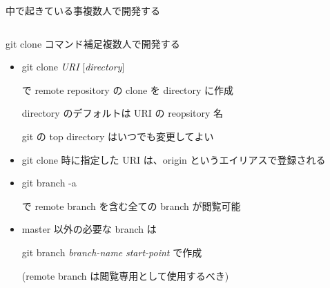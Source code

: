 \begin{frame}[t]{中で起きている事}{複数人で開発する}
\begin{columns}
\begin{column}{0.55\textwidth}
    \end{column}

  \end{columns}
  \vspace{2ex}






\end{frame}


\begin{frame}[t]{git clone コマンド補足}{複数人で開発する}

  \begin{itemize}
  \item git clone \textit{URI} [\textit{directory}]

    で remote repository の clone を directory に作成

    directory のデフォルトは URI の reopsitory 名

    git の top directory はいつでも変更してよい
    \vspace{2ex}

  \item git clone 時に指定した URI は、origin というエイリアスで登録される
    \vspace{2ex}

  \item git branch -a

    で remote branch を含む全ての branch が閲覧可能
    \vspace{2ex}

  \item master 以外の必要な branch は

    git branch \textit{branch-name} \textit{start-point} で作成

    (remote branch は閲覧専用として使用するべき)
  \end{itemize}

\end{frame}
